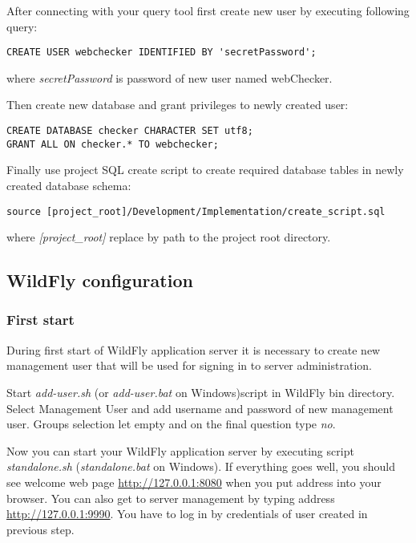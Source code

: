 \documentclass[12pt,a4paper]{article}
\begin{document}
After connecting with your query tool first create new user by executing following query:
\lstset{language=SQL}
\begin{lstlisting}
CREATE USER webchecker IDENTIFIED BY 'secretPassword';
\end{lstlisting}
where \textit{secretPassword} is password of new user named webChecker.

Then create new database and grant privileges to newly created user:
\begin{lstlisting}
CREATE DATABASE checker CHARACTER SET utf8;
GRANT ALL ON checker.* TO webchecker;
\end{lstlisting}

Finally use project SQL create script to create required database tables in newly created database schema:
\begin{lstlisting}
source [project_root]/Development/Implementation/create_script.sql
\end{lstlisting}
where \textit{[project\_root]} replace by path to the project root directory.

\subsection{WildFly configuration}
\subsubsection{First start}
During first start of WildFly application server it is necessary to create new management user that will be used for signing in to server administration. 

Start \textit{add-user.sh} (or \textit{add-user.bat} on Windows)script in WildFly bin directory. Select Management User and add username and password of new management user. Groups selection let empty and on the final question type \textit{no}.

Now you can start your WildFly application server by executing script \textit{standalone.sh} (\textit{standalone.bat} on Windows). If everything goes well, you should see welcome web page \url{http://127.0.0.1:8080} when you put address into your browser. You can also get to server management by typing address \url{http://127.0.0.1:9990}. You have to log in by credentials of user created in previous step.
\end{document}
